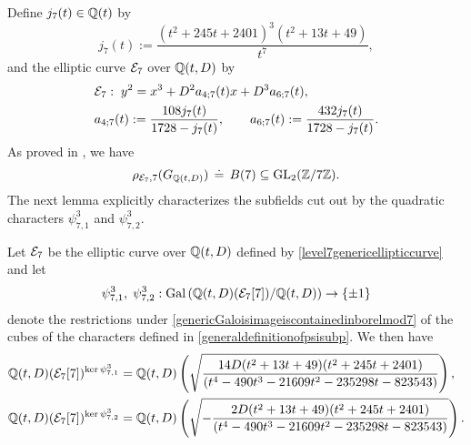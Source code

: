 Define $j_7(t) \in \mathbb{Q}(t)$ by
\begin{equation} \label{defofjsub7}
j_7(t) := \frac{(t^2 + 245t + 2401)^3(t^2 + 13t + 49)}{t^7},
\end{equation}
and the elliptic curve $\mathcal{E}_7$ over $\mathbb{Q}(t,D)$ by
\begin{equation} \label{level7genericellipticcurve}
\begin{split}
&\mathcal{E}_7 : \; y^2 = x^3 + D^2 a_{4;7}(t) x + D^3 a_{6;7}(t), \\
& a_{4;7}(t) := \frac{108 j_{7}(t)}{1728 - j_{7}(t)}, \quad\quad a_{6;7}(t) := \frac{432 j_{7}(t)}{1728 - j_{7}(t)}.
\end{split}
\end{equation}
As proved in \cite{zywina}, we have
\begin{equation} \label{genericGaloisimageiscontainedinborelmod7}
\rho_{\mathcal{E}_{7},7}(G_{\mathbb{Q}(t,D)}) \, \doteq \, B(7) \subseteq \operatorname{GL}_2(\mathbb{Z}/7\mathbb{Z}).
\end{equation}
The next lemma explicitly characterizes the subfields cut out by the quadratic characters $\psi_{7,1}^3$ and $\psi_{7,2}^3$.
\begin{lemma} \label{quadraticsubfieldsoflevel7lemma}
Let $\mathcal{E}_{7}$ be the elliptic curve over $\mathbb{Q}(t,D)$ defined by \eqref{level7genericellipticcurve} and let  
\[
\psi_{7,1}^3, \; \psi_{7,2}^3 : \operatorname{Gal}\left( \mathbb{Q}(t,D)(\mathcal{E}_{7}[7])/\mathbb{Q}(t,D) \right) \rightarrow \{ \pm 1 \}
\]
denote the restrictions under \eqref{genericGaloisimageiscontainedinborelmod7} of the cubes of the characters defined in \eqref{generaldefinitionofpsisubp}.  We then have
\begin{equation} \label{quadsubfieldsoflevel7lemmaeqn}
\begin{split}
\mathbb{Q}(t,D)(\mathcal{E}_{7}[7])^{\ker \psi_{7,1}^3} &= \mathbb{Q}(t,D)\left( \sqrt{\frac{14D(t^2 + 13t + 49)(t^2 + 245t + 2401)}{(t^4 - 490t^3 - 21609t^2 - 235298t - 823543)}} \right), \\
\mathbb{Q}(t,D)(\mathcal{E}_{7}[7])^{\ker \psi_{7,2}^3} &= \mathbb{Q}(t,D)\left( \sqrt{- \frac{2D(t^2 + 13t + 49)(t^2 + 245t + 2401)}{(t^4 - 490t^3 - 21609t^2 - 235298t - 823543)}} \right).
\end{split}
\end{equation}
\end{lemma}
